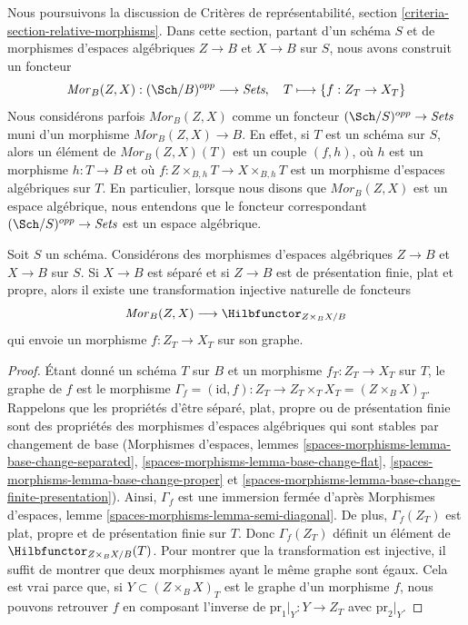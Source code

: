 \noindent
Nous poursuivons la discussion de Critères de représentabilité, section
\ref{criteria-section-relative-morphisms}.
Dans cette section, partant d'un schéma $S$ et de morphismes d'espaces
algébriques $Z \to B$ et $X \to B$ sur $S$, nous avons construit un foncteur
$$
\mathit{Mor}_B(Z, X) : (\Sch/B)^{opp} \longrightarrow \textit{Sets}, \quad
T \longmapsto \{f : Z_T \to X_T\}
$$
Nous considérons parfois $\mathit{Mor}_B(Z, X)$ comme un foncteur
$(\Sch/S)^{opp} \to \textit{Sets}$ muni d'un morphisme
$\mathit{Mor}_B(Z, X) \to B$.
En effet, si $T$ est un schéma sur $S$, alors un élément de
$\mathit{Mor}_B(Z, X)(T)$ est un couple $(f, h)$, où $h$ est un morphisme
$h : T \to B$ et où
$f : Z \times_{B, h} T \to X \times_{B, h} T$
est un morphisme d'espaces algébriques sur $T$. En particulier, lorsque nous
disons que $\mathit{Mor}_B(Z, X)$ est un espace algébrique, nous entendons que
le foncteur correspondant $(\Sch/S)^{opp} \to \textit{Sets}$ est un espace
algébrique.

\begin{lemma}
\label{lemma-Mor-into-Hilb}
Soit $S$ un schéma. Considérons des morphismes d'espaces algébriques
$Z \to B$ et $X \to B$ sur $S$.
Si $X \to B$ est séparé et si $Z \to B$ est de présentation finie,
plat et propre, alors il existe une transformation injective naturelle de
foncteurs
$$
\mathit{Mor}_B(Z, X) \longrightarrow \Hilbfunctor_{Z \times_B X/B}
$$
qui envoie un morphisme $f : Z_T \to X_T$ sur son graphe.
\end{lemma}

\begin{proof}
Étant donné un schéma $T$ sur $B$ et un morphisme $f_T : Z_T \to X_T$
sur $T$, le graphe de $f$ est le morphisme
$\Gamma_f = (\text{id}, f) : Z_T \to Z_T \times_T X_T = (Z \times_B X)_T$.
Rappelons que les propriétés d'être séparé, plat, propre ou de présentation
finie sont des propriétés des morphismes d'espaces algébriques qui sont stables
par changement de base (Morphismes d'espaces, lemmes
\ref{spaces-morphisms-lemma-base-change-separated},
\ref{spaces-morphisms-lemma-base-change-flat},
\ref{spaces-morphisms-lemma-base-change-proper} et
\ref{spaces-morphisms-lemma-base-change-finite-presentation}).
Ainsi, $\Gamma_f$ est une immersion fermée d'après
Morphismes d'espaces, lemme \ref{spaces-morphisms-lemma-semi-diagonal}.
De plus, $\Gamma_f(Z_T)$ est plat, propre et de présentation finie sur $T$.
Donc $\Gamma_f(Z_T)$ définit un élément de
$\Hilbfunctor_{Z \times_B X/B}(T)$.
Pour montrer que la transformation est injective, il suffit de montrer que deux
morphismes ayant le même graphe sont égaux. Cela est vrai parce que, si
$Y \subset (Z \times_B X)_T$ est le graphe d'un morphisme $f$, nous pouvons
retrouver $f$ en composant l'inverse de
$\text{pr}_1|_Y : Y \to Z_T$ avec $\text{pr}_2|_Y$.
\end{proof}

